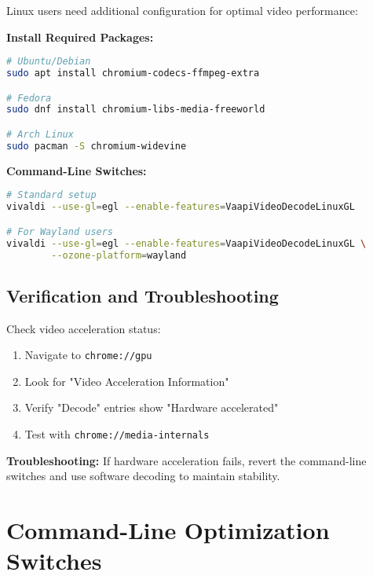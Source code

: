 \documentclass[11pt,a4paper,oneside]{book}
\newcommand{\keystroke}[1]{\texttt{\color{primaryblue}#1}}
\begin{document}
Linux users need additional configuration for optimal video performance:

\textbf{Install Required Packages:}
\begin{codebox}
\begin{lstlisting}[language=bash]
# Ubuntu/Debian
sudo apt install chromium-codecs-ffmpeg-extra

# Fedora
sudo dnf install chromium-libs-media-freeworld

# Arch Linux
sudo pacman -S chromium-widevine
\end{lstlisting}
\end{codebox}

\textbf{Command-Line Switches:}
\begin{codebox}
\begin{lstlisting}[language=bash]
# Standard setup
vivaldi --use-gl=egl --enable-features=VaapiVideoDecodeLinuxGL

# For Wayland users
vivaldi --use-gl=egl --enable-features=VaapiVideoDecodeLinuxGL \
        --ozone-platform=wayland
\end{lstlisting}
\end{codebox}

\subsection{Verification and Troubleshooting}

Check video acceleration status:

\begin{enumerate}
    \item Navigate to \keystroke{chrome://gpu}
    \item Look for "Video Acceleration Information"
    \item Verify "Decode" entries show "Hardware accelerated"
    \item Test with \keystroke{chrome://media-internals}
\end{enumerate}

\begin{warningbox}
\textbf{Troubleshooting:} If hardware acceleration fails, revert the command-line switches and use software decoding to maintain stability.
\end{warningbox}

\section{Command-Line Optimization Switches}
\end{document}

